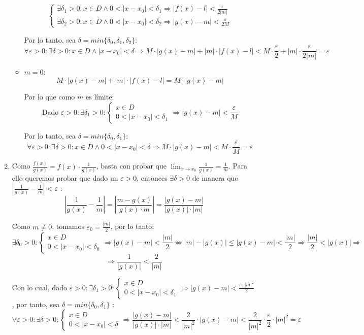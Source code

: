 \documentclass[10pt,a4paper,openright]{book}
\begin{document}
\begin{enumerate}
\begin{itemize}
$$\begin{cases} \exists \delta_1>0: x\in D\wedge 0<|x-x_0|<\delta_1 \Rightarrow |f(x)-l|<\frac{\varepsilon}{2|m|}\\ \exists \delta_2>0: x\in D\wedge 0<|x-x_0|<\delta_2\Rightarrow |g(x)-m|<\frac{\varepsilon}{2M}\end{cases}$$
	
	Por lo tanto, sea $\delta=min\{\delta_0,\delta_1,\delta_2\}$:
	$$\forall \varepsilon>0: \exists \delta>0: x\in D \wedge |x-x_0|<\delta\Rightarrow M\cdot |g(x)-m|+|m|\cdot |f(x)-l|<M\cdot \frac{\varepsilon}{2}+|m|\cdot \frac{\varepsilon}{2|m|}=\varepsilon$$
	
\item $m=0$:
$$M\cdot |g(x)-m|+|m|\cdot |f(x)-l|=M\cdot |g(x)-m|$$

Por lo que como $m$ es límite:
$$\mbox{Dado }\varepsilon>0: \exists \delta_1>0:\begin{cases} x\in D\\ 0<|x-x_0|<\delta_1\end{cases}\Rightarrow |g(x)-m|<\frac{\varepsilon}{M}$$

Por lo tanto, sea $\delta=min\{\delta_0, \delta_1\}$:
$$\forall \varepsilon>0: \exists \delta>0: x\in D\wedge 0<|x-x_0|<\delta\Rightarrow M\cdot |g(x)-m|< M\cdot \frac{\varepsilon}{M}=\varepsilon$$
\end{itemize}

\item Como $\frac{f(x)}{g(x)}=f(x)\cdot \frac{1}{g(x)}$, basta con probar que $\lim_{x\rightarrow x_0}\frac{1}{g(x)}=\frac{1}{m}$. Para ello queremos probar que dado un $\varepsilon>0$, entonces $\exists \delta>0$ de manera que $\left|\frac{1}{g(x)}-\frac{1}{m}\right|<\varepsilon$ :
$$\left|\frac{1}{g(x)}-\frac{1}{m}\right|=\left|\frac{m-g(x)}{g(x)\cdot m}\right|=\frac{|g(x)-m|}{|g(x)|\cdot |m|}$$

Como $m\neq 0$, tomamos $\varepsilon_0=\frac{|m|}{2}$, por lo tanto:
$$\exists \delta_0>0: \begin{cases} x\in D\\ 0<|x-x_0|<\delta_0\end{cases}\Rightarrow |g(x)-m|<\frac{|m|}{2}\Leftrightarrow |m|-|g(x)|\leq |g(x)-m|<\frac{|m|}{2} \Rightarrow \frac{|m|}{2}<|g(x)|\Rightarrow$$
$$\Rightarrow \frac{1}{|g(x)|}<\frac{2}{|m|}$$

Con lo cual, dado $\varepsilon>0: \exists \delta_1>0: \begin{cases} x\in D\\ 0<|x-x_0|<\delta_1\end{cases}\Rightarrow |g(x)-m|<\frac{\varepsilon\cdot |m|^2}{2}$, por tanto, sea $\delta=min\{\delta_0, \delta_1\}$ :
$$\forall \varepsilon>0: \exists \delta>0: \begin{cases} x\in D\\ 0<|x-x_0|<\delta\end{cases}\Rightarrow \frac{|g(x)-m|}{|g(x)|\cdot |m|}<\frac{2}{|m|^2}\cdot |g(x)-m|<\frac{2}{|m|^2}\cdot \frac{\varepsilon}{2}\cdot |m|^2=\varepsilon$$
\end{enumerate}
\end{document}
